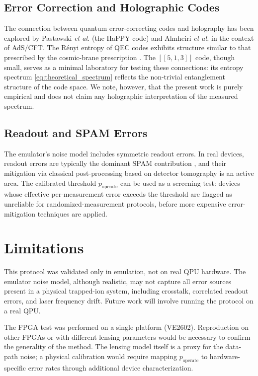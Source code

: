 \documentclass[12pt,a4paper,oneside]{book}
\theoremstyle{plain}
\theoremstyle{definition}
\theoremstyle{remark}
\begin{document}
\subsection{Error Correction and Holographic Codes}

The connection between quantum error-correcting codes and holography has been explored by Pastawski \textit{et al.} \cite{pastawski2015holographic} (the HaPPY code) and Almheiri \textit{et al.} \cite{almheiri2019holographic} in the context of AdS/CFT. The R\'enyi entropy of QEC codes exhibits structure similar to that prescribed by the cosmic-brane prescription \cite{dong2016holographic}. The $[[5,1,3]]$ code, though small, serves as a minimal laboratory for testing these connections: its entropy spectrum \cref{eq:theoretical_spectrum} reflects the non-trivial entanglement structure of the code space. We note, however, that the present work is purely empirical and does not claim any holographic interpretation of the measured spectrum.

\subsection{Readout and SPAM Errors}

The emulator's noise model includes symmetric readout errors. In real devices, readout errors are typically the dominant SPAM contribution \cite{maciejewski2020mitigation}, and their mitigation via classical post-processing based on detector tomography is an active area. The calibrated threshold $p_{\text{operate}}$ can be used as a screening test: devices whose effective per-measurement error exceeds the threshold are flagged as unreliable for randomized-measurement protocols, before more expensive error-mitigation techniques are applied.

\section{Limitations}
\label{sec:disc_limitations}

This protocol was validated only in emulation, not on real QPU hardware. The emulator noise model, although realistic, may not capture all error sources present in a physical trapped-ion system, including crosstalk, correlated readout errors, and laser frequency drift. Future work will involve running the protocol on a real QPU.

The FPGA test was performed on a single platform (VE2602). Reproduction on other FPGAs or with different lensing parameters would be necessary to confirm the generality of the method. The lensing model itself is a proxy for the data-path noise; a physical calibration would require mapping $p_{\text{operate}}$ to hardware-specific error rates through additional device characterization.
\end{document}
